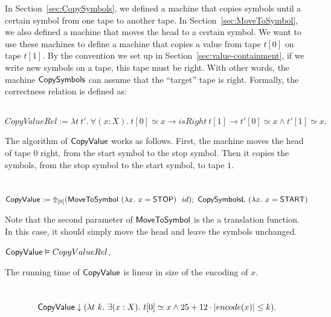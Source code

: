 In Section~\ref{sec:CopySymbols}, we defined a machine that copies symbols until a certain symbol from one tape to another tape.  In
Section~\ref{sec:MoveToSymbol}, we also defined a machine that moves the head to a certain symbol.  We want to use these machines to define a machine
that copies a value from tape $t[0]$ on tape $t[1]$.  By the convention we set up in Section~\ref{sec:value-containment}, if we write new symbols on a
tape, this tape must be right.  With other words, the machine $\MS{CopySymbols}$ can assume that the ``target'' tape is right.  Formally, the
correctness relation is defined as:
%
\begin{definition}
  \label{def:CopyValue_Rel}
  ~
  \[
    CopyValueRel := \lambda t~t'.~\forall (x:X).~t[0] \simeq x \rightarrow isRight~t[1] \rightarrow t'[0] \simeq x \land t'[1] \simeq x.
  \]
\end{definition}

The algorithm of $\MS{CopyValue}$ works as follows.  First, the machine moves the head of tape $0$ right, from the start symbol to the stop symbol.
Then it copies the symbols, from the stop symbol to the start symbol, to tape $1$.

\begin{definition}[$\MS{CopyValue}$][CopyValue]
  \label{def:CopyValue}
  ~
  \small
  \[
    \MS{CopyValue} := \LiftTapes{(\MS{MoveToSymbol}~(\lambda x.~x=\MS{STOP})~~id)}{\Vector{0}} \Seq \MS{CopySymbolsL}~(\lambda x.~x=\MS{START})
  \]
\end{definition}

Note that the second parameter of $\MS{MoveToSymbol}$ is the a translation function.  In this case, it should simply move the head and leave the
symbols unchanged.

\begin{lemma}
  \label{lem:CopyValue_Realise}
  $\MS{CopyValue} \Realise CopyValueRel$.
\end{lemma}

The running time of $\MS{CopyValue}$ is linear in size of the encoding of $x$.
\begin{lemma}
  \label{lem:CopyValue_TerminatesIn}
  ~
  \[
    \MS{CopyValue} \TerminatesIn (\lambda t~k.~\exists(x:X).~t[0] \simeq x \land 25 + 12 \cdot \size{x} \leq k).
  \]
\end{lemma}

